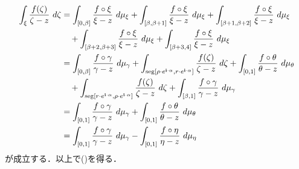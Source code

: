 	\begin{align}
		\int_{\xi} \frac{f(\zeta)}{\zeta - z}\ d\zeta
		&= \int_{[0,\beta]} \frac{f \circ \xi}{\xi - z}\ d\mu_{\xi} 
			+ \int_{[\beta,\beta+1]} \frac{f \circ \xi}{\xi - z}\ d\mu_{\xi}
			+ \int_{[\beta+1,\beta+2]} \frac{f \circ \xi}{\xi - z}\ d\mu_{\xi} \\
			&\quad + \int_{[\beta+2,\beta+3]} \frac{f \circ \xi}{\xi - z}\ d\mu_{\xi}
			+ \int_{[\beta+3,4]} \frac{f \circ \xi}{\xi - z}\ d\mu_{\xi} \\
		&= \int_{[0,\beta]} \frac{f \circ \gamma}{\gamma - z}\ d\mu_{\gamma} 
			+ \int_{\seg{\rho \cdot e^{\isym \cdot \alpha}}{r \cdot e^{\isym \cdot \alpha}}} \frac{f(\zeta)}{\zeta - z}\ d\zeta
			+ \int_{[0,1]} \frac{f \circ \theta}{\theta - z}\ d\mu_{\theta} \\
			&\quad + \int_{\seg{r \cdot e^{\isym \cdot \alpha}}{\rho \cdot e^{\isym \cdot \alpha}}} \frac{f(\zeta)}{\zeta - z}\ d\zeta
			+ \int_{[\beta,1]} \frac{f \circ \gamma}{\gamma - z}\ d\mu_{\gamma} \\
		&= \int_{[0,1]} \frac{f \circ \gamma}{\gamma - z}\ d\mu_{\gamma} + \int_{[0,1]} \frac{f \circ \theta}{\theta - z}\ d\mu_{\theta} \\
		&= \int_{[0,1]} \frac{f \circ \gamma}{\gamma - z}\ d\mu_{\gamma} - \int_{[0,1]} \frac{f \circ \eta}{\eta - z}\ d\mu_{\eta}
	\end{align}
	が成立する．以上で()を得る．
	

